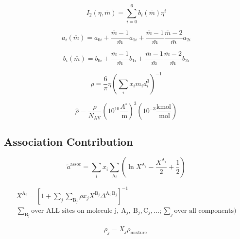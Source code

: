 \documentclass[12pt, letterpaper]{article}
\begin{document}
\begin{equation}
I_2(\eta, \bar{m})=\sum_{i=0}^6 b_i(\bar{m}) \eta^i
\end{equation}

\begin{equation}
a_i(\bar{m})=a_{0 i}+\frac{\bar{m}-1}{\bar{m}} a_{1 i}+\frac{\bar{m}-1}{\bar{m}} \frac{\bar{m}-2}{\bar{m}} a_{2 i}
\end{equation}

\begin{equation}
b_i(\bar{m})=b_{0 i}+\frac{\bar{m}-1}{\bar{m}} b_{1 i}+\frac{\bar{m}-1}{\bar{m}} \frac{\bar{m}-2}{\bar{m}} b_{2 i}
\end{equation}

\begin{equation}
\rho=\frac{6}{\pi} \eta\left(\sum_i x_i m_i d_i^3\right)^{-1}
\end{equation}

\begin{equation}
\hat{\rho}=\frac{\rho}{N_{\mathrm{AV}}}\left(10^{10} \frac{A^\circ{}}{\mathrm{~m}}\right)^3\left(10^{-3} \frac{\mathrm{kmol}}{\mathrm{~mol}}\right)
\end{equation}

\subsection{Association Contribution}

\cite{Chapman1990}

\begin{equation}
\tilde{a}^{\mathrm{assoc}}= \sum_i x_i\sum_{\mathrm{A}_i}\left(\ln X^{\mathrm{A}_i}-\frac{X^{\mathrm{A}_i}}{2}+\frac{1}{2}\right)
\end{equation}

\begin{equation}
\begin{gathered}
X^{\mathrm{A}_i} =\left[1+ \sum_j \sum_{\mathrm{B}_j} \rho x_jX^{\mathrm{B}_j} \Delta^{\mathrm{A}_i \mathrm{~B}_j}\right]^{-1}  \\ \sum_{\mathrm{B}_j}  \text{over ALL sites on molecule j},  \mathrm{~A}_j, \mathrm{~B}_j, \mathrm{C}_j, \ldots ; \sum_j \text{over all components})
\end{gathered}
\end{equation}

\begin{equation}
\rho_j=X_j \rho_{\text {mixture }}
\end{equation}
\end{document}
